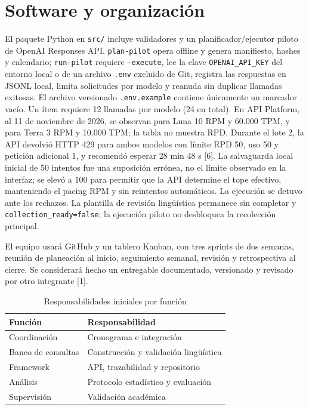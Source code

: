 \documentclass[conference]{IEEEtran}
\begin{document}
\section{Software y organización}
El paquete Python en \texttt{src/} incluye validadores y un planificador/ejecutor piloto de OpenAI Responses API. \texttt{plan-pilot} opera offline y genera manifiesto, hashes y calendario; \texttt{run-pilot} requiere \texttt{--execute}, lee la clave \texttt{OPENAI\_API\_KEY} del entorno local o de un archivo \texttt{.env} excluido de Git, registra las respuestas en JSONL local, limita solicitudes por modelo y reanuda sin duplicar llamadas exitosas. El archivo versionado \texttt{.env.example} contiene únicamente un marcador vacío. Un ítem requiere 12 llamadas por modelo (24 en total). En API Platform, al 11 de noviembre de 2026, se observan para Luna 10 RPM y 60.000 TPM, y para Terra 3 RPM y 10.000 TPM; la tabla no muestra RPD. Durante el lote 2, la API devolvió HTTP 429 para ambos modelos con límite RPD 50, uso 50 y petición adicional 1, y recomendó esperar 28 min 48 s [6]. La salvaguarda local inicial de 50 intentos fue una suposición errónea, no el límite observado en la interfaz; se elevó a 100 para permitir que la API determine el tope efectivo, manteniendo el pacing RPM y sin reintentos automáticos. La ejecución se detuvo ante los rechazos. La plantilla de revisión lingüística permanece sin completar y \texttt{collection\_ready=false}; la ejecución piloto no desbloquea la recolección principal.

El equipo usará GitHub y un tablero Kanban, con tres sprints de dos semanas, reunión de planeación al inicio, seguimiento semanal, revisión y retrospectiva al cierre. Se considerará hecho un entregable documentado, versionado y revisado por otro integrante [1].

\begin{table}[ht]
\caption{Responsabilidades iniciales por función}
\centering
\begin{tabularx}{\columnwidth}{p{}X}
\toprule
Función & Responsabilidad \\
\midrule
Coordinación & Cronograma e integración \\
Banco de consultas & Construcción y validación lingüística \\
Framework & API, trazabilidad y repositorio \\
Análisis & Protocolo estadístico y evaluación \\
Supervisión & Validación académica \\
\bottomrule
\end{tabularx}
\end{table}
\end{document}
